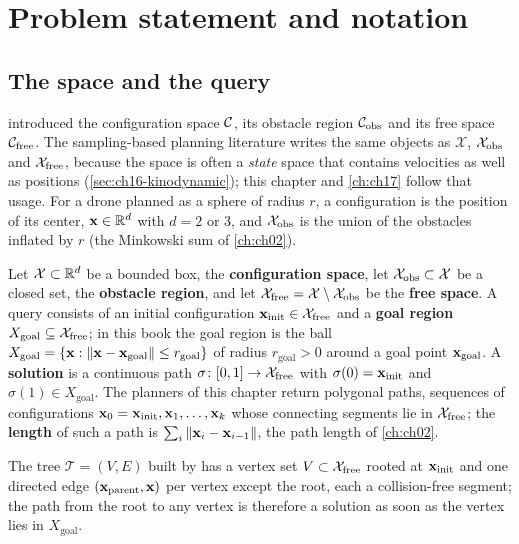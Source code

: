 \section{Problem statement and notation}
\label{sec:ch16-problem}

\subsection{The space and the query}

 introduced the configuration space $\mathcal{C}$, its obstacle
region $\mathcal{C}_{\mathrm{obs}}$ and its free space $\mathcal{C}_{\mathrm{free}}$. The sampling-based planning
literature writes the same objects as $\mathcal{X}$, $\mathcal{X}_{\mathrm{obs}}$ and $\mathcal{X}_{\mathrm{free}}$,
because the space is often a \emph{state} space that contains velocities as
well as positions (\cref{sec:ch16-kinodynamic}); this chapter and
\cref{ch:ch17} follow that usage. For a drone planned as a sphere of radius
$r$, a configuration is the position of its center, $\mathbf{x}\in\mathbb{R}^{d}$ with $d=2$
or $3$, and $\mathcal{X}_{\mathrm{obs}}$ is the union of the obstacles inflated by $r$ (the
Minkowski sum of \cref{ch:ch02}).

\begin{definition}
\label{def:ch16-problem}
Let $\mathcal{X}\subset\mathbb{R}^{d}$ be a bounded box, the \textbf{configuration
space}, let
$\mathcal{X}_{\mathrm{obs}}\subset\mathcal{X}$ be a closed set, the \textbf{obstacle region}, and
let $\mathcal{X}_{\mathrm{free}}=\mathcal{X}\setminus\mathcal{X}_{\mathrm{obs}}$ be the \textbf{free
space}. A query consists of an initial configuration
$\mathbf{x}_{\mathrm{init}}\in\mathcal{X}_{\mathrm{free}}$ and a \textbf{goal region}
$X_{\mathrm{goal}}\subseteq\mathcal{X}_{\mathrm{free}}$; in this book the goal region is the ball
$X_{\mathrm{goal}}=\left\{ \mathbf{x} : \left\lVert \mathbf{x}-\mathbf{x}_{\mathrm{goal}} \right\rVert\le r_{\mathrm{goal}} \right\}$
of radius $r_{\mathrm{goal}}>0$ around a goal point $\mathbf{x}_{\mathrm{goal}}$.
A \textbf{solution} is a continuous path
$\sigma\colon[0,1]\to\mathcal{X}_{\mathrm{free}}$ with $\sigma(0)=\mathbf{x}_{\mathrm{init}}$ and
$\sigma(1)\in X_{\mathrm{goal}}$. The planners of this chapter return
polygonal paths, sequences of configurations $\mathbf{x}_0=\mathbf{x}_{\mathrm{init}},\mathbf{x}_1,\dots,\mathbf{x}_k$
whose connecting segments lie in $\mathcal{X}_{\mathrm{free}}$; the \textbf{length} of such a path is
$\sum_{i}\left\lVert \mathbf{x}_{i}-\mathbf{x}_{i-1} \right\rVert$, the path length of \cref{ch:ch02}.
\end{definition}

The tree $\mathcal{T}=(V,E)$ built by \rrt has a vertex set $V\subset\mathcal{X}_{\mathrm{free}}$ rooted at
$\mathbf{x}_{\mathrm{init}}$ and one directed edge $(\mathbf{x}_{\mathrm{parent}},\mathbf{x})$ per
vertex except the root, each a collision-free segment; the path from the
root to any vertex is therefore a solution as soon as the vertex lies in
$X_{\mathrm{goal}}$.


